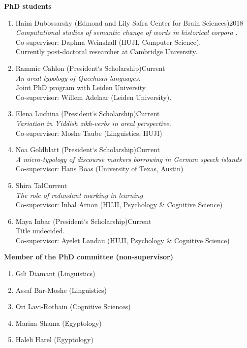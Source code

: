 \documentclass[letterpaper,11pt]{article}
\begin{document}
\begin{flushleft}\textbf{PhD students}
\end{flushleft}
\begin{enumerate}
\item {Haim Dubossarsky (Edmond and Lily Safra Center for Brain Sciences)}\hfill{2018}\\
\textit{Computational studies of semantic change of words in historical corpora} .\\ 
Co-supervisor: Daphna Weinshall (HUJI, Computer Science).\\Currently post-doctoral researcher at Cambridge University.
\item Rammie Cahlon (President`s Scholarship)\hfill{Current}\\
\textit{An areal typology of Quechuan languages.}\\{Joint PhD program with Leiden University}\\ Co-supervisor: Willem Adelaar (Leiden University).
\item Elena Luchina (President`s Scholarship)\hfill{Current}\\\textit{Variation in Yiddish zikh-verbs in areal perspective.}\\Co-supervisor: Moshe Taube (Linguistics, HUJI)
\item Noa Goldblatt (President`s Scholarship)\hfill{Current}\\\textit{A micro-typology of discourse markers borrowing in German speech islands }\\Co-supervisor: Hans Boas (University of Texas, Austin)
\item {Shira Tal}\hfill{Current}\\\textit{The role of redundant marking in learning}\\Co-supervisor: Inbal Arnon (HUJI, Psychology \& Cognitive Science)
\item {Maya Inbar (President`s Scholarship)}\hfill{Current}\\Title undecided.\\Co-supervisor: Ayelet Landau (HUJI, Psychology \& Cognitive Science)
\end{enumerate}

\begin{flushleft}\textbf{Member of the PhD committee (non-supervisor)}
\begin{enumerate}
\item Gili Diamant (Linguistics)
\item Assaf Bar-Moshe (Linguistics)
\item Ori Lavi-Rotbain (Cognitive Sciences)
\item Marina Shama (Egyptology)
\item Haleli Harel (Egyptology)

\end{enumerate}
\end{flushleft}
\end{document}
